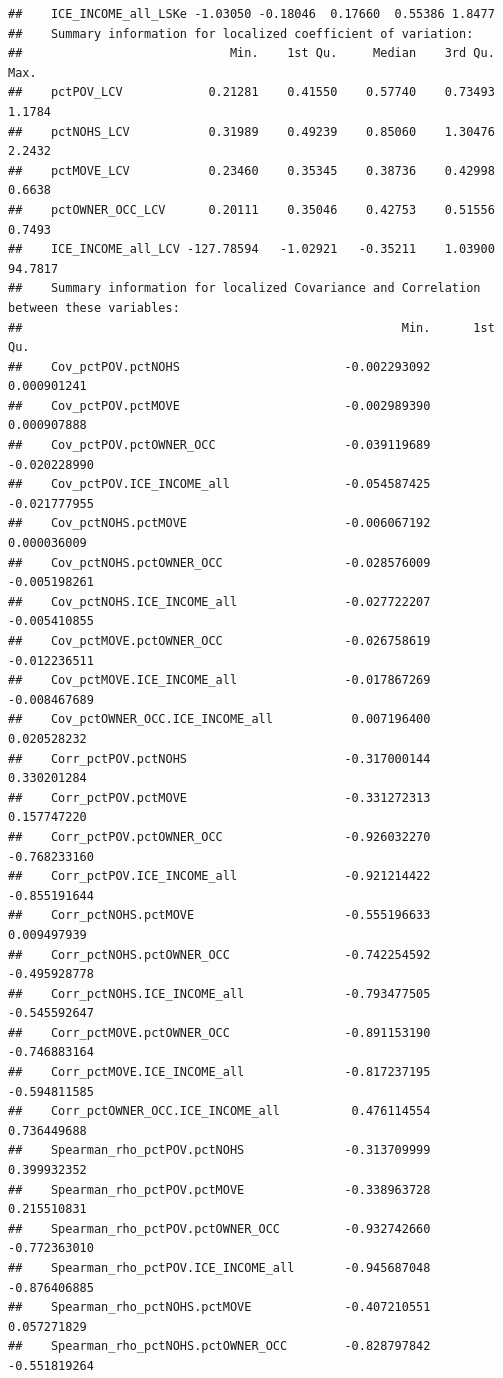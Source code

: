 \documentclass[
]{book}
\begin{document}
\begin{verbatim}
##    ICE_INCOME_all_LSKe -1.03050 -0.18046  0.17660  0.55386 1.8477
##    Summary information for localized coefficient of variation:
##                             Min.    1st Qu.     Median    3rd Qu.    Max.
##    pctPOV_LCV            0.21281    0.41550    0.57740    0.73493  1.1784
##    pctNOHS_LCV           0.31989    0.49239    0.85060    1.30476  2.2432
##    pctMOVE_LCV           0.23460    0.35345    0.38736    0.42998  0.6638
##    pctOWNER_OCC_LCV      0.20111    0.35046    0.42753    0.51556  0.7493
##    ICE_INCOME_all_LCV -127.78594   -1.02921   -0.35211    1.03900 94.7817
##    Summary information for localized Covariance and Correlation between these variables:
##                                                     Min.      1st Qu.
##    Cov_pctPOV.pctNOHS                       -0.002293092  0.000901241
##    Cov_pctPOV.pctMOVE                       -0.002989390  0.000907888
##    Cov_pctPOV.pctOWNER_OCC                  -0.039119689 -0.020228990
##    Cov_pctPOV.ICE_INCOME_all                -0.054587425 -0.021777955
##    Cov_pctNOHS.pctMOVE                      -0.006067192  0.000036009
##    Cov_pctNOHS.pctOWNER_OCC                 -0.028576009 -0.005198261
##    Cov_pctNOHS.ICE_INCOME_all               -0.027722207 -0.005410855
##    Cov_pctMOVE.pctOWNER_OCC                 -0.026758619 -0.012236511
##    Cov_pctMOVE.ICE_INCOME_all               -0.017867269 -0.008467689
##    Cov_pctOWNER_OCC.ICE_INCOME_all           0.007196400  0.020528232
##    Corr_pctPOV.pctNOHS                      -0.317000144  0.330201284
##    Corr_pctPOV.pctMOVE                      -0.331272313  0.157747220
##    Corr_pctPOV.pctOWNER_OCC                 -0.926032270 -0.768233160
##    Corr_pctPOV.ICE_INCOME_all               -0.921214422 -0.855191644
##    Corr_pctNOHS.pctMOVE                     -0.555196633  0.009497939
##    Corr_pctNOHS.pctOWNER_OCC                -0.742254592 -0.495928778
##    Corr_pctNOHS.ICE_INCOME_all              -0.793477505 -0.545592647
##    Corr_pctMOVE.pctOWNER_OCC                -0.891153190 -0.746883164
##    Corr_pctMOVE.ICE_INCOME_all              -0.817237195 -0.594811585
##    Corr_pctOWNER_OCC.ICE_INCOME_all          0.476114554  0.736449688
##    Spearman_rho_pctPOV.pctNOHS              -0.313709999  0.399932352
##    Spearman_rho_pctPOV.pctMOVE              -0.338963728  0.215510831
##    Spearman_rho_pctPOV.pctOWNER_OCC         -0.932742660 -0.772363010
##    Spearman_rho_pctPOV.ICE_INCOME_all       -0.945687048 -0.876406885
##    Spearman_rho_pctNOHS.pctMOVE             -0.407210551  0.057271829
##    Spearman_rho_pctNOHS.pctOWNER_OCC        -0.828797842 -0.551819264

\end{verbatim}
\end{document}
